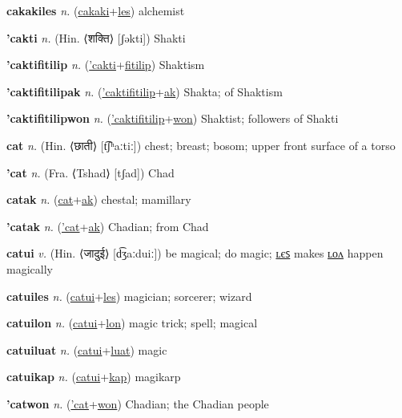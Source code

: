 \textbf{\hypertarget{cakakiles}{cakakiles}} \textit{n.} (\hyperlink{cakaki}{cakaki}+\allowbreak \hyperlink{les}{les})
alchemist

\textbf{\hypertarget{'cakti}{'cakti}} \textit{n.} (Hin. ⟨{\devanagari{}शक्ति}⟩ [ʃəkti])
Shakti

\textbf{\hypertarget{'caktifitilip}{'caktifitilip}} \textit{n.} (\hyperlink{'cakti}{'cakti}+\allowbreak \hyperlink{fitilip}{fitilip})
Shaktism

\textbf{\hypertarget{'caktifitilipak}{'caktifitilipak}} \textit{n.} (\hyperlink{'caktifitilip}{'caktifitilip}+\allowbreak \hyperlink{ak}{ak})
Shakta; of Shaktism

\textbf{\hypertarget{'caktifitilipwon}{'caktifitilipwon}} \textit{n.} (\hyperlink{'caktifitilip}{'caktifitilip}+\allowbreak \hyperlink{won}{won})
Shaktist; followers of Shakti

\textbf{\hypertarget{cat}{cat}} \textit{n.} (Hin. ⟨{\devanagari{}छाती}⟩ [t͡ʃʰaːtiː])
chest; breast; bosom; upper front surface of a torso

\textbf{\hypertarget{'cat}{'cat}} \textit{n.} (Fra. ⟨Tshad⟩ [tʃad])
Chad

\textbf{\hypertarget{catak}{catak}} \textit{n.} (\hyperlink{cat}{cat}+\allowbreak \hyperlink{ak}{ak})
chestal; mamillary

\textbf{\hypertarget{'catak}{'catak}} \textit{n.} (\hyperlink{'cat}{'cat}+\allowbreak \hyperlink{ak}{ak})
Chadian; from Chad

\textbf{\hypertarget{catui}{catui}} \textit{v.} (Hin. ⟨{\devanagari{}जादुई}⟩ [d͡ʒaːduiː])
be magical; do magic; \hyperlink{catuiles}{ʟєꜱ} makes \hyperlink{catuilon}{ʟᴏᴧ} happen magically

\textbf{\hypertarget{catuiles}{catuiles}} \textit{n.} (\hyperlink{catui}{catui}+\allowbreak \hyperlink{les}{les})
magician; sorcerer; wizard

\textbf{\hypertarget{catuilon}{catuilon}} \textit{n.} (\hyperlink{catui}{catui}+\allowbreak \hyperlink{lon}{lon})
magic trick; spell; magical

\textbf{\hypertarget{catuiluat}{catuiluat}} \textit{n.} (\hyperlink{catui}{catui}+\allowbreak \hyperlink{luat}{luat})
magic

\textbf{\hypertarget{catuikap}{catuikap}} \textit{n.} (\hyperlink{catui}{catui}+\allowbreak \hyperlink{kap}{kap})
magikarp

\textbf{\hypertarget{'catwon}{'catwon}} \textit{n.} (\hyperlink{'cat}{'cat}+\allowbreak \hyperlink{won}{won})
Chadian; the Chadian people

